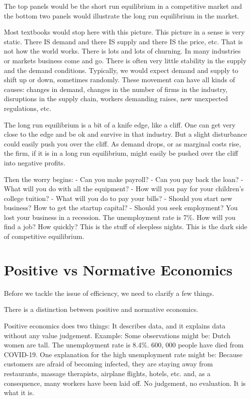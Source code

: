 \documentclass[
]{book}
\begin{document}
The top panels would be the short run equilibrium in a competitive market and the bottom two panels would illustrate the long run equilibrium in the market.

Most textbooks would stop here with this picture. This picture in a sense is very static. There IS demand and there IS supply and there IS the price, etc. That is not how the world works. There is lots and lots of churning. In many industries or markets business come and go. There is often very little stability in the supply and the demand conditions. Typically, we would expect demand and supply to shift up or down, sometimes randomly. These movement can have all kinds of causes: changes in demand, changes in the number of firms in the industry, disruptions in the supply chain, workers demanding raises, new unexpected regulations, etc.

The long run equilibrium is a bit of a knife edge, like a cliff. One can get very close to the edge and be ok and survive in that industry. But a slight disturbance could easily push you over the cliff. As demand drops, or as marginal costs rise, the firm, if it is in a long run equilibrium, might easily be pushed over the cliff into negative profits.

Then the worry begins:
- Can you make payroll?
- Can you pay back the loan?
- What will you do with all the equipment?
- How will you pay for your children's college tuition?
- What will you do to pay your bills?
- Should you start new business? How to get the startup capital?
- Should you seek employment? You lost your business in a recession. The unemployment rate is 7\%. How will you find a job? How quickly?
This is the stuff of sleepless nights. This is the dark side of competitive equilibrium.

\hypertarget{positive-vs-normative-economics}{%
\section{Positive vs Normative Economics}\label{positive-vs-normative-economics}}

Before we tackle the issue of efficiency, we need to clarify a few things.

There is a distinction between positive and normative economics.

Positive economics does two things: It describes data, and it explains data without any value judgement.
Example: Some observations might be:
Dutch women are tall.
The unemployment rate is 8.4\%.
600, 000 people have died from COVID-19.
One explanation for the high unemployment rate might be: Because customers are afraid of becoming infected, they are staying away from restaurants, massage therapists, airplane flights, hotels, etc. and, as a consequence, many workers have been laid off.
No judgement, no evaluation. It is what it is.
\end{document}
